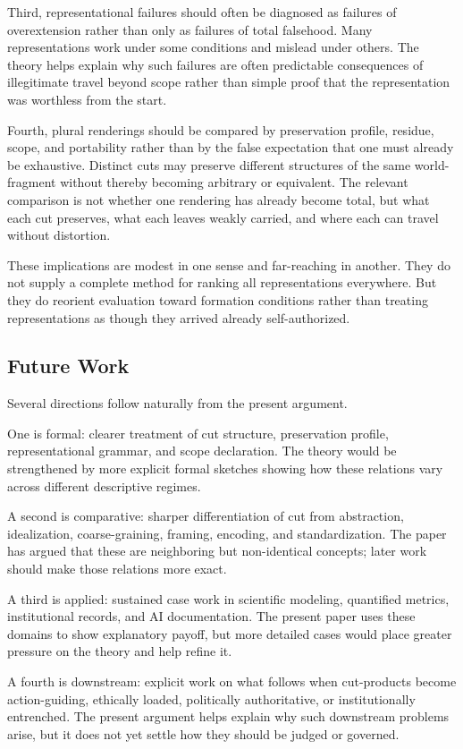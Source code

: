 \documentclass[11pt]{article}
\begin{document}
Third, representational failures should often be diagnosed as failures of overextension rather than only as failures of total falsehood. Many representations work under some conditions and mislead under others. The theory helps explain why such failures are often predictable consequences of illegitimate travel beyond scope rather than simple proof that the representation was worthless from the start.

Fourth, plural renderings should be compared by preservation profile, residue, scope, and portability rather than by the false expectation that one must already be exhaustive. Distinct cuts may preserve different structures of the same world-fragment without thereby becoming arbitrary or equivalent. The relevant comparison is not whether one rendering has already become total, but what each cut preserves, what each leaves weakly carried, and where each can travel without distortion.

These implications are modest in one sense and far-reaching in another. They do not supply a complete method for ranking all representations everywhere. But they do reorient evaluation toward formation conditions rather than treating representations as though they arrived already self-authorized.

\subsection{Future Work}

Several directions follow naturally from the present argument.

One is formal: clearer treatment of cut structure, preservation profile, representational grammar, and scope declaration. The theory would be strengthened by more explicit formal sketches showing how these relations vary across different descriptive regimes.

A second is comparative: sharper differentiation of cut from abstraction, idealization, coarse-graining, framing, encoding, and standardization. The paper has argued that these are neighboring but non-identical concepts; later work should make those relations more exact.

A third is applied: sustained case work in scientific modeling, quantified metrics, institutional records, and AI documentation. The present paper uses these domains to show explanatory payoff, but more detailed cases would place greater pressure on the theory and help refine it.

A fourth is downstream: explicit work on what follows when cut-products become action-guiding, ethically loaded, politically authoritative, or institutionally entrenched. The present argument helps explain why such downstream problems arise, but it does not yet settle how they should be judged or governed.
\end{document}
